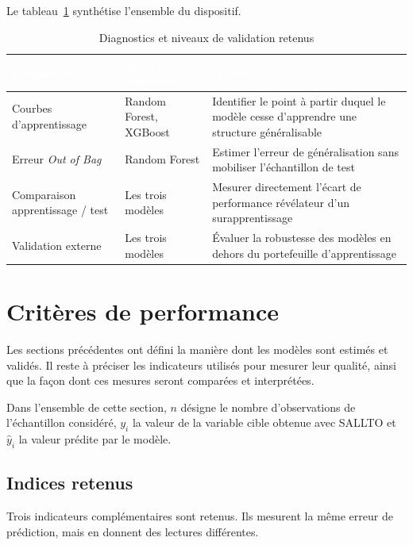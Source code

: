 Le tableau~\ref{tab:diagnostics} synthétise l'ensemble du dispositif.

\begin{table}[H]
\centering
\caption{Diagnostics et niveaux de validation retenus}
\label{tab:diagnostics}
\renewcommand{\arraystretch}{1.3}
\begin{tabular}{p{3.6cm} p{3.4cm} p{7.0cm}}
\toprule
\rowcolor{rougeEntreprise}
\textcolor{white}{\textbf{Diagnostic}} &
\textcolor{white}{\textbf{Modèles concernés}} &
\textcolor{white}{\textbf{Objectif}} \\
\midrule
Courbes d'apprentissage & 
Random Forest, XGBoost & 
Identifier le point à partir duquel le modèle cesse d'apprendre une structure 
généralisable \\
\addlinespace
\rowcolor{rosePale}
Erreur \textit{Out of Bag} & 
Random Forest & 
Estimer l'erreur de généralisation sans mobiliser l'échantillon de test \\
\addlinespace
Comparaison apprentissage / test & 
Les trois modèles & 
Mesurer directement l'écart de performance révélateur d'un surapprentissage \\
\addlinespace
\rowcolor{rosePale}
Validation externe & 
Les trois modèles & 
Évaluer la robustesse des modèles en dehors du portefeuille d'apprentissage \\
\bottomrule
\end{tabular}
\end{table}

\section{Critères de performance}


Les sections précédentes ont défini la manière dont les modèles sont estimés et validés. Il 
reste à préciser les indicateurs utilisés pour mesurer leur qualité, ainsi que la façon dont 
ces mesures seront comparées et interprétées.

Dans l'ensemble de cette section, $n$ désigne le nombre d'observations de l'échantillon 
considéré, $y_i$ la valeur de la variable cible obtenue avec SALLTO et $\hat{y}_i$ la valeur 
prédite par le modèle.

\subsection{Indices retenus}


Trois indicateurs complémentaires sont retenus. Ils mesurent la même erreur de prédiction, 
mais en donnent des lectures différentes.

